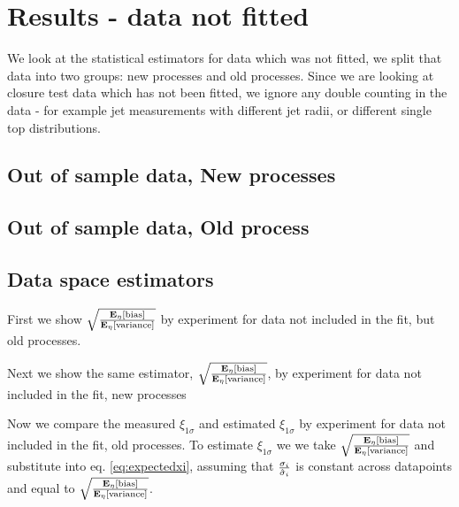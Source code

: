 \section{Results - data not fitted}

We look at the statistical estimators for data which was not fitted, we split
that data into two groups: new processes and old processes. Since we are looking
at closure test data which has not been fitted, we ignore any double counting
in the data - for example jet measurements with different jet radii,
or different single top distributions.

\subsection{Out of sample data, New processes}



\subsection{Out of sample data, Old process}



\subsection{Data space estimators}

First we show $\sqrt{\frac{\mathbf{E}_{\eta}\left[ {\rm bias} \right]}{\mathbf{E}_{\eta}\left[ {\rm variance} \right]}}$ by experiment for data
not included in the fit, but old processes.



Next we show the same estimator, $\sqrt{\frac{\mathbf{E}_{\eta}\left[ {\rm bias} \right]}{\mathbf{E}_{\eta}\left[ {\rm variance} \right]}}$, by
experiment for data not included in the fit, new processes



Now we compare the measured $\xi_{1\sigma}$ and estimated $\xi_{1\sigma}$ by experiment
for data not included in the fit, old processes. To estimate $\xi_{1\sigma}$
we we take $\sqrt{\frac{\mathbf{E}_{\eta}\left[ {\rm bias} \right]}{\mathbf{E}_{\eta}\left[ {\rm variance} \right]}}$ and substitute into
eq. \eqref{eq:expectedxi}, assuming that $\frac{\sigma_i}{\hat{\sigma}_i}$ is
constant across datapoints and equal to $\sqrt{\frac{\mathbf{E}_{\eta}\left[ {\rm bias} \right]}{\mathbf{E}_{\eta}\left[ {\rm variance} \right]}}$.



